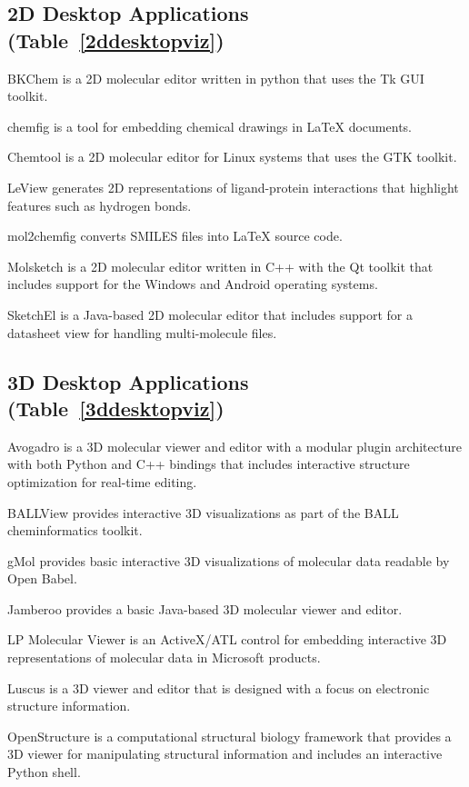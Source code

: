 \subsection*{2D Desktop Applications (Table~\ref{2ddesktopviz})}

BKChem is a 2D molecular editor written in python that uses the Tk GUI toolkit.

chemfig is a tool for embedding chemical drawings in {\LaTeX} documents.

Chemtool is a 2D molecular editor for Linux systems that uses the GTK toolkit.

LeView \cite{Caboche_2013} generates 2D representations of ligand-protein interactions that highlight features such as hydrogen bonds.

mol2chemfig \cite{Brefo_Mensah_2012} converts SMILES files into {\LaTeX} source code.

Molsketch is a 2D molecular editor written in C++ with the Qt toolkit that includes support for the Windows and Android operating systems.

SketchEl is a Java-based 2D molecular editor that includes support for a datasheet view for handling multi-molecule files.

\subsection*{3D Desktop Applications (Table~\ref{3ddesktopviz})}

Avogadro \cite{Hanwell_2012} is a 3D molecular viewer and editor with a modular plugin architecture with both Python and C++ bindings that includes interactive structure optimization for real-time editing. 

BALLView \cite{Moll_2005} provides interactive 3D visualizations as part of the BALL \cite{Hildebrandt_2010} cheminformatics toolkit.

gMol provides basic interactive 3D visualizations of molecular data readable by Open Babel.

Jamberoo provides a basic Java-based 3D molecular viewer and editor.

LP Molecular Viewer is an ActiveX/ATL control for embedding interactive 3D representations of molecular data in Microsoft products.

Luscus \cite{Kova_evi__2015} is a 3D viewer and editor that is designed with a focus on electronic structure information.

OpenStructure \cite{Biasini_2013} is a computational structural biology framework that provides a 3D viewer for manipulating structural information and includes an interactive Python shell.

